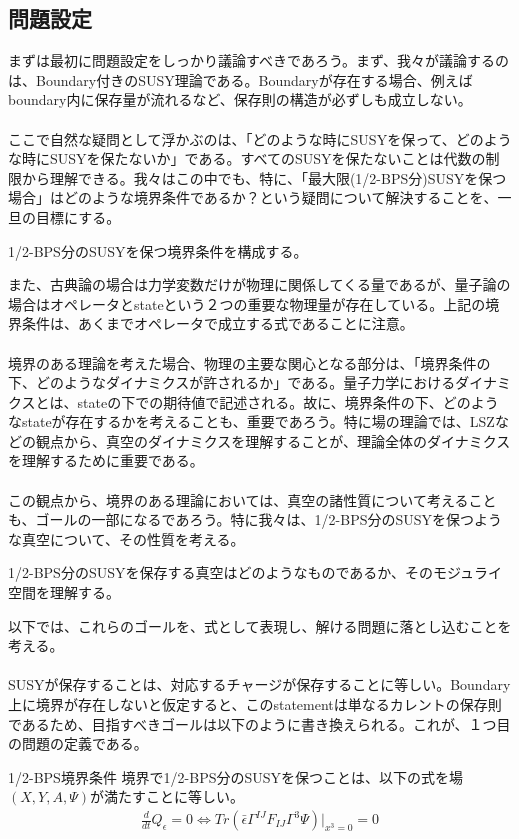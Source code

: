 \documentclass[dvipdfmx,a4paper,10.5pt]{article}
\numberwithin{equation}{section}
\begin{document}
\subsection{問題設定}
まずは最初に問題設定をしっかり議論すべきであろう。まず、我々が議論するのは、Boundary付きのSUSY理論である。Boundaryが存在する場合、例えばboundary内に保存量が流れるなど、保存則の構造が必ずしも成立しない。\\
\\
ここで自然な疑問として浮かぶのは、「どのような時にSUSYを保って、どのような時にSUSYを保たないか」である。すべてのSUSYを保たないことは代数の制限から理解できる。我々はこの中でも、特に、「最大限(1/2-BPS分)SUSYを保つ場合」はどのような境界条件であるか？という疑問について解決することを、一旦の目標にする。
\begin{goalbox}
1/2-BPS分のSUSYを保つ境界条件を構成する。
\end{goalbox}
また、古典論の場合は力学変数だけが物理に関係してくる量であるが、量子論の場合はオペレータとstateという２つの重要な物理量が存在している。上記の境界条件は、あくまでオペレータで成立する式であることに注意。\\
\\
境界のある理論を考えた場合、物理の主要な関心となる部分は、「境界条件の下、どのようなダイナミクスが許されるか」である。量子力学におけるダイナミクスとは、stateの下での期待値で記述される。故に、境界条件の下、どのようなstateが存在するかを考えることも、重要であろう。特に場の理論では、LSZなどの観点から、真空のダイナミクスを理解することが、理論全体のダイナミクスを理解するために重要である。\\
\\
この観点から、境界のある理論においては、真空の諸性質について考えることも、ゴールの一部になるであろう。特に我々は、1/2-BPS分のSUSYを保つような真空について、その性質を考える。
\begin{goalbox}
    1/2-BPS分のSUSYを保存する真空はどのようなものであるか、そのモジュライ空間を理解する。
\end{goalbox}
以下では、これらのゴールを、式として表現し、解ける問題に落とし込むことを考える。\\
\\
SUSYが保存することは、対応するチャージが保存することに等しい。Boundary上に境界が存在しないと仮定すると、このstatementは単なるカレントの保存則であるため、目指すべきゴールは以下のように書き換えられる。これが、１つ目の問題の定義である。
\begin{defbox}{1/2-BPS境界条件}
    境界で1/2-BPS分のSUSYを保つことは、以下の式を場$(X,Y,A,\Psi)$が満たすことに等しい。
    \begin{align*}
        \frac{d}{dt}Q_{\epsilon}=0
\iff Tr(\bar{\epsilon}\Gamma^{IJ}F_{IJ}\Gamma^{3}\Psi)|_{x^{3}=0}=0
    \end{align*}
\end{defbox}
\end{document}
